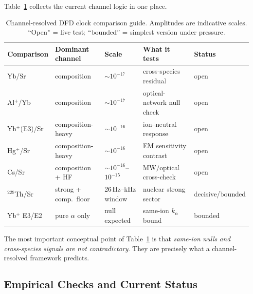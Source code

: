 Table~\ref{tab:clock-predictions} collects the current channel logic in one place.

\begin{table}[t]
\centering
\caption{Channel-resolved DFD clock comparison guide.  Amplitudes are indicative scales.  ``Open'' = live test; ``bounded'' = simplest version under pressure.}
\label{tab:clock-predictions}
\renewcommand{\arraystretch}{1.2}
\small
\begin{tabular}{@{}lllll@{}}
\toprule
Comparison & Dominant channel & Scale & What it tests & Status \\
\midrule
Yb/Sr & composition & $\sim 10^{-17}$ & cross-species residual & open \\
Al$^+$/Yb & composition & $\sim 10^{-17}$ & optical-network null check & open \\
Yb$^+$(E3)/Sr & composition-heavy & $\sim 10^{-16}$ & ion--neutral response & open \\
Hg$^+$/Sr & composition-heavy & $\sim 10^{-16}$ & EM sensitivity contrast & open \\
Cs/Sr & composition + HF & $\sim 10^{-16}$--$10^{-15}$ & MW/optical cross-check & open \\
$^{229}$Th/Sr & strong + comp.\ floor & 26\,Hz--kHz window & nuclear strong sector & decisive/bounded \\
Yb$^+$ E3/E2 & pure $\alpha$ only & null expected & same-ion $k_\alpha$ bound & bounded \\
\bottomrule
\end{tabular}
\end{table}

The most important conceptual point of Table~\ref{tab:clock-predictions} is that \emph{same-ion nulls and cross-species signals are not contradictory}.  They are precisely what a channel-resolved framework predicts.

\subsection{Empirical Checks and Current Status}\label{sec:clocks-evidence}

